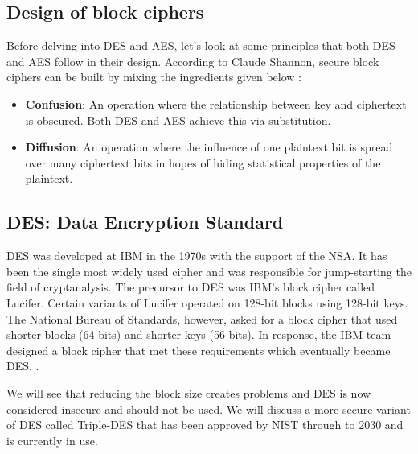 \subsection{Design of block ciphers}

Before delving into DES and AES, let's look at some principles that both DES and AES follow in their design. According to Claude Shannon, secure block ciphers can be built by mixing the ingredients given below \cite{ClaudeShannonInfoTheory}:

\begin{itemize}
\item \textbf{Confusion}: An operation where the relationship between key and ciphertext is obscured. Both DES and AES achieve this via substitution.

\item \textbf{Diffusion}: An operation where the influence of one plaintext bit is spread over many ciphertext bits in hopes of hiding statistical properties of the plaintext.
\end{itemize}

\subsection{DES: Data Encryption Standard}
\par DES was developed at IBM in the 1970s with the support of the NSA. It has been the single most widely used cipher and was responsible for jump-starting the field of cryptanalysis. The precursor to DES was IBM's block cipher called Lucifer. Certain variants of Lucifer
operated on 128-bit blocks using 128-bit keys. The National Bureau of Standards, however, asked for a block cipher that used shorter blocks 
(64 bits) and shorter keys (56 bits). In response, the IBM team designed a block cipher that met these requirements which eventually became 
DES. \cite{BonehShoupBook}.

\par We will see that reducing the block size creates problems and DES is now considered insecure and should not be used. We will discuss a more secure variant of DES called Triple-DES that has been approved by NIST through to 2030 and is currently in use\cite{BonehShoupBook}. 

